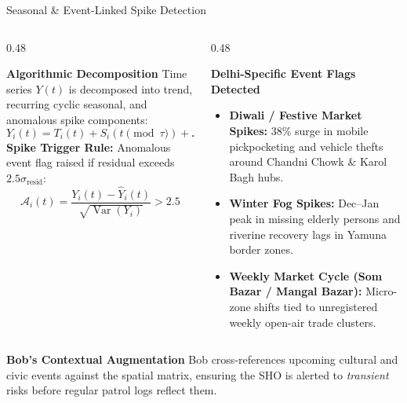 \documentclass[aspectratio=169,10pt]{beamer}
\begin{document}
\begin{frame}{Seasonal \& Event-Linked Spike Detection}
  \begin{columns}[T]
    \begin{column}{0.48\textwidth}
      \begin{block}{\textbf{Algorithmic Decomposition}}
        \footnotesize
        Time series $Y(t)$ is decomposed into trend, recurring cyclic seasonal, and anomalous spike components:
        \begin{equation*}
          Y_i(t) = T_i(t) + S_i(t \pmod \tau) + \mathcal{A}_i(t)
        \end{equation*}
        \textbf{Spike Trigger Rule:}
        Anomalous event flag raised if residual exceeds $2.5\sigma_{\text{resid}}$:
        \begin{equation*}
          \mathcal{A}_i(t) = \frac{Y_i(t) - \hat{Y}_i(t)}{\sqrt{\operatorname{Var}(Y_i)}} > 2.5
        \end{equation*}
      \end{block}
    \end{column}

    \begin{column}{0.48\textwidth}
      \begin{alertblock}{\textbf{Delhi-Specific Event Flags Detected}}
        \footnotesize
        \begin{itemize}\itemsep=0.4em
          \item \textbf{Diwali / Festive Market Spikes:} 38\% surge in mobile pickpocketing and vehicle thefts around Chandni Chowk \& Karol Bagh hubs.
          \item \textbf{Winter Fog Spikes:} Dec--Jan peak in missing elderly persons and riverine recovery lags in Yamuna border zones.
          \item \textbf{Weekly Market Cycle (Som Bazar / Mangal Bazar):} Micro-zone shifts tied to unregistered weekly open-air trade clusters.
        \end{itemize}
      \end{alertblock}
    \end{column}
  \end{columns}

  \vspace{0.2cm}
  \begin{exampleblock}{\textbf{Bob's Contextual Augmentation}}
    \footnotesize Bob cross-references upcoming cultural and civic events against the spatial matrix, ensuring the SHO is alerted to \textit{transient} risks before regular patrol logs reflect them.
  \end{exampleblock}
\end{frame}
\end{document}
